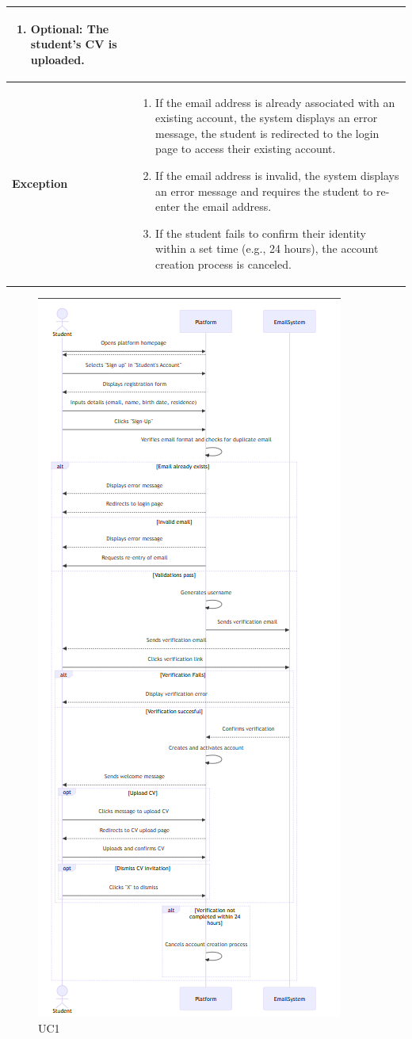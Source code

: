 \begin{longtable}{|p{}|p{}|}
\begin{enumerate}
    \item  Optional: The student’s CV is uploaded.
\end{enumerate}\\
\hline
\textbf{Exception} & 
\begin{enumerate}
    \item If the email address is already associated with an existing account, the system displays an error message, the student is redirected to the login page to access their existing account.

    \item If the email address is invalid, the system displays an error message and requires the student to re-enter the email address.

    \item If the student fails to confirm their identity within a set time (e.g., 24 hours), the account creation process is canceled.
\end{enumerate}
\\
\hline
\end{longtable}

\begin{figure}[H]
    \centering
    \includegraphics[width=0.6\linewidth]{RASD//Images/UC1.png}
    \caption{UC1}
\end{figure}

